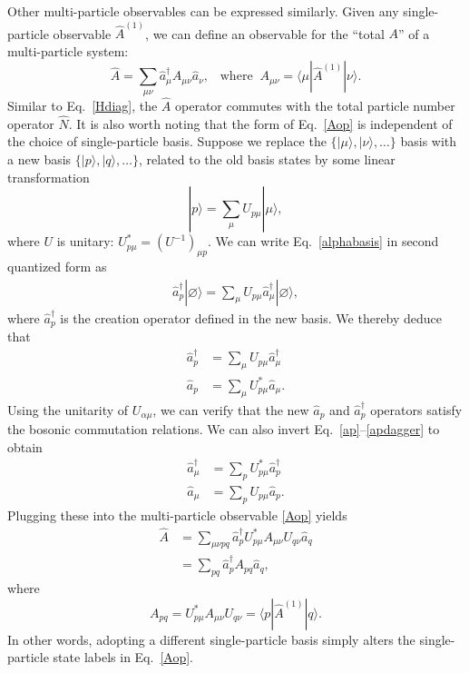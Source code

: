 \documentclass[prx,12pt]{revtex4-2}
\begin{document}
Other multi-particle observables can be expressed similarly.  Given
any single-particle observable $\hat{A}^{(1)}$, we can define an
observable for the ``total $A$'' of a multi-particle system:
\begin{equation}
  \hat{A} = \sum_{\mu\nu} \hat{a}^\dagger_\mu A_{\mu\nu} \hat{a}_\nu, \;\;\; \mathrm{where}\;\; A_{\mu\nu} = \langle\mu|\hat{A}^{(1)}|\nu\rangle.
  \label{Aop}
\end{equation}
Similar to Eq.~\eqref{Hdiag}, the $\hat{A}$ operator commutes with the
total particle number operator $\hat{N}$.  It is also worth noting
that the form of Eq.~\eqref{Aop} is independent of the choice of
single-particle basis.  Suppose we replace the $\{|\mu\rangle,
|\nu\rangle, \dots\}$ basis with a new basis $\{|p\rangle, |q\rangle,
\dots\}$, related to the old basis states by some linear
transformation
\begin{equation}
  |p\rangle = \sum_\mu U_{p\mu} |\mu\rangle,
  \label{alphabasis}
\end{equation}
where $U$ is unitary: $U^*_{p \mu} = (U^{-1})_{\mu p}$.  We can write
Eq.~\eqref{alphabasis} in second quantized form as
\begin{align}
  \hat{a}_p^\dagger|\varnothing\rangle = \sum_\mu U_{p\mu}
  \hat{a}_\mu^\dagger |\varnothing\rangle,
\end{align}
where $\hat{a}_p^\dagger$ is the creation operator defined in the new
basis.  We thereby deduce that
\begin{align}
  \hat{a}_p^\dagger &= \sum_\mu U_{p\mu} \hat{a}_\mu^\dagger \label{ap}\\
  \hat{a}_p &= \sum_\mu U_{p\mu}^* \hat{a}_\mu. \label{apdagger}
\end{align}
Using the unitarity of $U_{\alpha\mu}$, we can verify that the new
$\hat{a}_p$ and $\hat{a}_p^\dagger$ operators satisfy the bosonic
commutation relations.  We can also invert
Eq.~\eqref{ap}--\eqref{apdagger} to obtain
\begin{align}
  \hat{a}_\mu^\dagger &= \sum_p U_{p\mu}^* \hat{a}_p^\dagger\\
  \hat{a}_\mu &= \sum_p U_{p\mu} \hat{a}_p.
\end{align}
Plugging these into the multi-particle observable \eqref{Aop} yields
\begin{align}
  \hat{A} &= \sum_{\mu\nu pq}
  \hat{a}^\dagger_p U_{p\mu}^* A_{\mu\nu} U_{q\nu} \hat{a}_q \\
  &= \sum_{pq}
  \hat{a}^\dagger_p A_{pq} \hat{a}_q,
\end{align}
where
\begin{equation}
  A_{pq} = U_{p\mu}^* A_{\mu\nu} U_{q\nu}
  = \langle p | \hat{A}^{(1)} |q\rangle.
\end{equation}
In other words, adopting a different single-particle basis simply
alters the single-particle state labels in Eq.~\eqref{Aop}.
    
\end{document}
